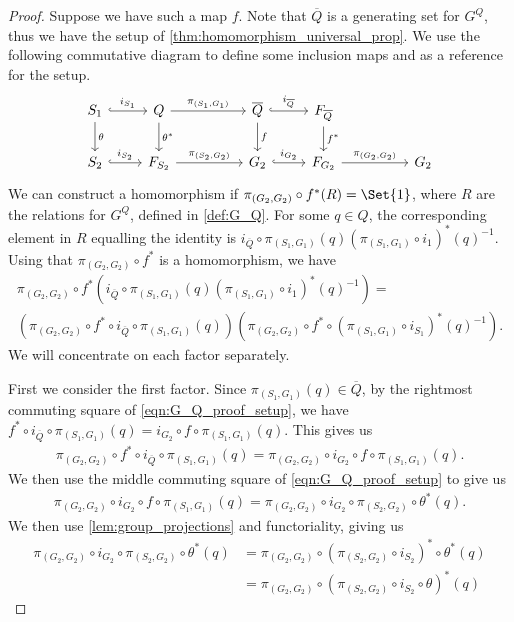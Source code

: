 \begin{proof}
	Suppose we have such a map $f$.
	Note that  $\overline{Q}$ is a generating set for  $G^Q$, thus we have the setup of \cref{thm:homomorphism_universal_prop}.
	We use the following commutative diagram to define some inclusion maps and as a reference for the setup.
	\begin{equation}
		\begin{tikzcd}
			S_1 \ar[d, "\theta"] \ar[r, hook, "i_{S_1}"] & Q \ar[d, "\theta^*"] \ar[rr, "\pi_{(S_1, G_1)}"] & & \overline{Q} \ar[d, "f"] \ar[r, hook, "i_{\overline{Q}}"] & F_{\overline{Q}} \ar[d, "f^*"]
			\\ S_2 \ar[r, hook, "i_{S_2}"] & F_{S_2} \ar[rr, "\pi_{(S_2, G_2)}"] & & G_2 \ar[r, hook, "i_{G_2}"] & F_{G_2} \ar[rr, "\pi_{(G_2, G_2)}"] & & G_2
		\end{tikzcd}
		\label{eqn:G_Q_proof_setup}
	\end{equation}
	We can construct a homomorphism if $\pi_{(G_2, G_2)} \circ f^*(R) = \Set{1}$, where $R$ are the relations for $G^Q$, defined in \cref{def:G_Q}.
	For some $q \in Q$, the corresponding element in $R$ equalling the identity is  $i_{\overline{Q}} \circ \pi_{(S_1,G_1)}(q)(\pi_{(S_1,G_1)} \circ i_1)^*(q)^{-1}$.
	Using that $\pi_{(G_2,G_2)} \circ f^*$ is a homomorphism, we have
	\begin{align*}
		\pi_{(G_2,G_2)} \circ f^* \left(i_{\overline{Q}} \circ \pi_{(S_1,G_1)}(q)(\pi_{(S_1,G_1)} \circ i_1)^*(q)^{-1}\right) =
		\\ \left(\pi_{(G_2,G_2)} \circ f^* \circ i_{\overline{Q}} \circ \pi_{(S_1,G_1)} (q)\right) \left( \pi_{(G_2,G_2)} \circ f^* \circ\left( \pi_{(S_1,G_1)} \circ i_{S_1}\right)^*(q)^{-1} \right).
	\end{align*}
	We will concentrate on each factor separately.

	First we consider the first factor.
	Since $\pi_{(S_1, G_1)}(q) \in \overline{Q}$, by the rightmost commuting square of \eqref{eqn:G_Q_proof_setup}, we have $f^* \circ i_{\overline{Q}} \circ \pi_{(S_1, G_1)}(q) = i_{G_2} \circ f \circ \pi_{(S_1,G_1)} (q)$.
	This gives us
	\begin{align*}
		\pi_{(G_2,G_2)} \circ f^* \circ i_{\overline{Q}} \circ \pi_{(S_1,G_1)} (q) = \pi_{(G_2,G_2)} \circ i_{G_2} \circ f \circ \pi_{(S_1,G_1)}(q).
	\end{align*}
	We then use the middle commuting square of \eqref{eqn:G_Q_proof_setup} to give us
	\begin{align*}
		\pi_{(G_2,G_2)} \circ i_{G_2} \circ f \circ \pi_{(S_1,G_1)}(q) = \pi_{(G_2,G_2)} \circ i_{G_2} \circ \pi_{(S_2,G_2)} \circ \theta^*(q).
	\end{align*}
	We then use \cref{lem:group_projections} and functoriality, giving us
	\begin{align*}
		\pi_{(G_2,G_2)} \circ i_{G_2} \circ \pi_{(S_2,G_2)} \circ \theta^*(q) &= \pi_{(G_2,G_2)} \circ \left( \pi_{(S_2,G_2)} \circ i_{S_2} \right)^*  \circ \theta^*(q)
										   \\ &= \pi_{(G_2,G_2)} \circ \left( \pi_{(S_2,G_2)} \circ i_{S_2} \circ \theta \right)^*(q)
	\end{align*}


\end{proof}
